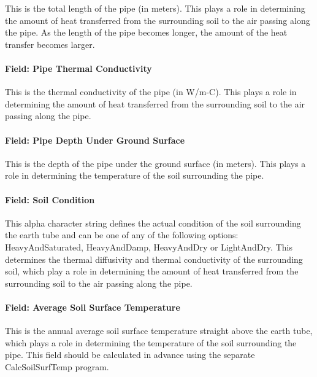 This is the total length of the pipe (in meters). This plays a role in determining the amount of heat transferred from the surrounding soil to the air passing along the pipe. As the length of the pipe becomes longer, the amount of the heat transfer becomes larger.

\paragraph{Field: Pipe Thermal Conductivity}\label{field-pipe-thermal-conductivity}

This is the thermal conductivity of the pipe (in W/m-C). This plays a role in determining the amount of heat transferred from the surrounding soil to the air passing along the pipe.

\paragraph{Field: Pipe Depth Under Ground Surface}\label{field-pipe-depth-under-ground-surface}

This is the depth of the pipe under the ground surface (in meters). This plays a role in determining the temperature of the soil surrounding the pipe.

\paragraph{Field: Soil Condition}\label{field-soil-condition}

This alpha character string defines the actual condition of the soil surrounding the earth tube and can be one of any of the following options: HeavyAndSaturated, HeavyAndDamp, HeavyAndDry or LightAndDry. This determines the thermal diffusivity and thermal conductivity of the surrounding soil, which play a role in determining the amount of heat transferred from the surrounding soil to the air passing along the pipe.

\paragraph{Field: Average Soil Surface Temperature}\label{field-average-soil-surface-temperature}

This is the annual average soil surface temperature straight above the earth tube, which plays a role in determining the temperature of the soil surrounding the pipe. This field should be calculated in advance using the separate CalcSoilSurfTemp program.

